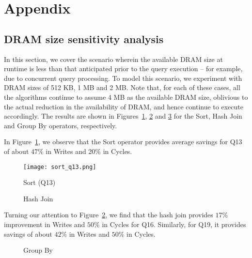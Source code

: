 \newpage
\section{Appendix}

\subsection{DRAM size sensitivity analysis}
In this section, we cover the scenario wherein the available DRAM size
at runtime is less than that anticipated prior to the query execution --
for example, due to concurrent query processing.  To model this scenario,
we experiment with DRAM sizes of 512 KB, 1 MB and 2 MB. Note that, for
each of these cases, all the algorithms continue to assume 4 MB as the
available DRAM size, oblivious to the actual reduction in the availability
of DRAM, and hence continue to execute accordingly. The results are shown
in Figures~\ref{fig:sort}, \ref{fig:join} and \ref{fig:gby} for the Sort,
Hash Join and Group By operators, respectively.

In Figure~\ref{fig:sort}, we observe that the Sort operator provides average savings
for Q13 of about 47\% in Writes and 20\% in Cycles.

\begin{figure}[h]
	\centering
	\texttt{[image: sort\_q13.png]}
    \caption{Sort (Q13)}
	\label{fig:sort}
\end{figure}







\begin{figure}[h]
	\centering
	\caption{Hash Join}
	\label{fig:join}
\end{figure}

Turning our attention to Figure~\ref{fig:join}, we find that the hash join provides
$17\%$ improvement in Writes and $50\%$ in Cycles for Q16. Similarly, for Q19, it provides
savings of about $42\%$ in Writes and $50\%$ in Cycles.

\begin{figure}[htbp]
\centering
{}
\caption{Group By}
\label{fig:gby}
\end{figure}

